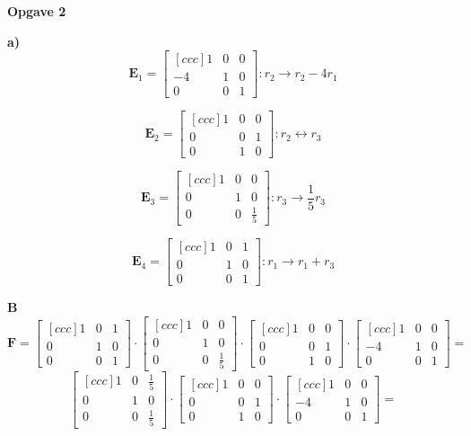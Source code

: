 \documentclass[12pt,a4paper]{article}
\begin{document}
{\bf Opgave 2 }

\textbf{a)}\\

\[
\textbf{E}_1 =   
\begin{bmatrix}[ccc]
  1 & 0 & 0 \\
  -4 & 1 & 0 \\
  0 & 0 & 1
\end{bmatrix}:
r_2 \rightarrow r_2 -4r_1\]

\[
\textbf{E}_2 =   
\begin{bmatrix}[ccc]
  1 & 0 & 0 \\
  0 & 0 & 1 \\
  0 & 1 & 0
\end{bmatrix}:
r_2 \leftrightarrow r_3\]

\[
\textbf{E}_3 =   
\begin{bmatrix}[ccc]
  1 & 0 & 0 \\
  0 & 1 & 0 \\
  0 & 0 & \frac{1}{5}
\end{bmatrix}:
r_3 \rightarrow \frac{1}{5} r_3\]

\[
\textbf{E}_4 =   
\begin{bmatrix}[ccc]
  1 & 0 & 1 \\
  0 & 1 & 0 \\
  0 & 0 & 1
\end{bmatrix}:
r_1 \rightarrow r_1 + r_3\]

\textbf{B}\\

\[
\textbf{F} = 
\begin{bmatrix}[ccc]
  1 & 0 & 1 \\
  0 & 1 & 0 \\
  0 & 0 & 1
\end{bmatrix} \cdot
\begin{bmatrix}[ccc]
  1 & 0 & 0 \\
  0 & 1 & 0 \\
  0 & 0 & \frac{1}{5} 
\end{bmatrix}\cdot
\begin{bmatrix}[ccc]
  1 & 0 & 0 \\
  0 & 0 & 1 \\
  0 & 1 & 0
\end{bmatrix} \cdot
\begin{bmatrix}[ccc]
  1 & 0 & 0 \\
  -4 & 1 & 0 \\
  0 & 0 & 1
\end{bmatrix} =
\]
\[
\begin{bmatrix}[ccc]
  1 & 0 & \frac{1}{5} \\
  0 & 1 & 0 \\
  0 & 0 & \frac{1}{5}
\end{bmatrix} \cdot 
\begin{bmatrix}[ccc]
  1 & 0 & 0 \\
  0 & 0 & 1 \\
  0 & 1 & 0
\end{bmatrix} \cdot
\begin{bmatrix}[ccc]
  1 & 0 & 0 \\
  -4 & 1 & 0 \\
  0 & 0 & 1
\end{bmatrix} = 
\]
\end{document}

